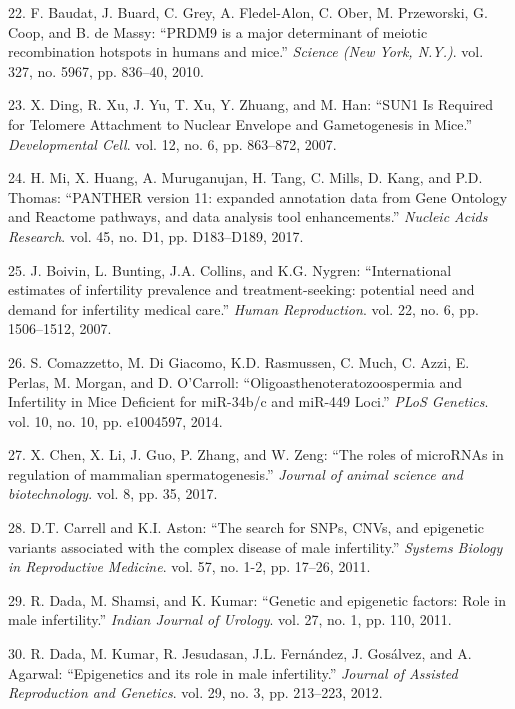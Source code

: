 \documentclass[12pt,twoside]{reedthesis}
\begin{document}
  \hypertarget{ref-Baudat2010}{}
  22. F. Baudat, J. Buard, C. Grey, A. Fledel-Alon, C. Ober, M.
  Przeworski, G. Coop, and B. de Massy: ``PRDM9 is a major determinant of
  meiotic recombination hotspots in humans and mice.'' \emph{Science (New
  York, N.Y.)}. vol. 327, no. 5967, pp. 836--40, 2010.
  
  \hypertarget{ref-Ding2007}{}
  23. X. Ding, R. Xu, J. Yu, T. Xu, Y. Zhuang, and M. Han: ``SUN1 Is
  Required for Telomere Attachment to Nuclear Envelope and Gametogenesis
  in Mice.'' \emph{Developmental Cell}. vol. 12, no. 6, pp. 863--872,
  2007.
  
  \hypertarget{ref-Mi2017}{}
  24. H. Mi, X. Huang, A. Muruganujan, H. Tang, C. Mills, D. Kang, and
  P.D. Thomas: ``PANTHER version 11: expanded annotation data from Gene
  Ontology and Reactome pathways, and data analysis tool enhancements.''
  \emph{Nucleic Acids Research}. vol. 45, no. D1, pp. D183--D189, 2017.
  
  \hypertarget{ref-Boivin2007a}{}
  25. J. Boivin, L. Bunting, J.A. Collins, and K.G. Nygren:
  ``International estimates of infertility prevalence and
  treatment-seeking: potential need and demand for infertility medical
  care.'' \emph{Human Reproduction}. vol. 22, no. 6, pp. 1506--1512, 2007.
  
  \hypertarget{ref-Comazzetto2014}{}
  26. S. Comazzetto, M. Di Giacomo, K.D. Rasmussen, C. Much, C. Azzi, E.
  Perlas, M. Morgan, and D. O'Carroll: ``Oligoasthenoteratozoospermia and
  Infertility in Mice Deficient for miR-34b/c and miR-449 Loci.''
  \emph{PLoS Genetics}. vol. 10, no. 10, pp. e1004597, 2014.
  
  \hypertarget{ref-Chen2017}{}
  27. X. Chen, X. Li, J. Guo, P. Zhang, and W. Zeng: ``The roles of
  microRNAs in regulation of mammalian spermatogenesis.'' \emph{Journal of
  animal science and biotechnology}. vol. 8, pp. 35, 2017.
  
  \hypertarget{ref-Carrell2011}{}
  28. D.T. Carrell and K.I. Aston: ``The search for SNPs, CNVs, and
  epigenetic variants associated with the complex disease of male
  infertility.'' \emph{Systems Biology in Reproductive Medicine}. vol. 57,
  no. 1-2, pp. 17--26, 2011.
  
  \hypertarget{ref-Dada2011}{}
  29. R. Dada, M. Shamsi, and K. Kumar: ``Genetic and epigenetic factors:
  Role in male infertility.'' \emph{Indian Journal of Urology}. vol. 27,
  no. 1, pp. 110, 2011.
  
  \hypertarget{ref-Dada2012}{}
  30. R. Dada, M. Kumar, R. Jesudasan, J.L. Fernández, J. Gosálvez, and A.
  Agarwal: ``Epigenetics and its role in male infertility.'' \emph{Journal
  of Assisted Reproduction and Genetics}. vol. 29, no. 3, pp. 213--223,
  2012.
  
\end{document}
